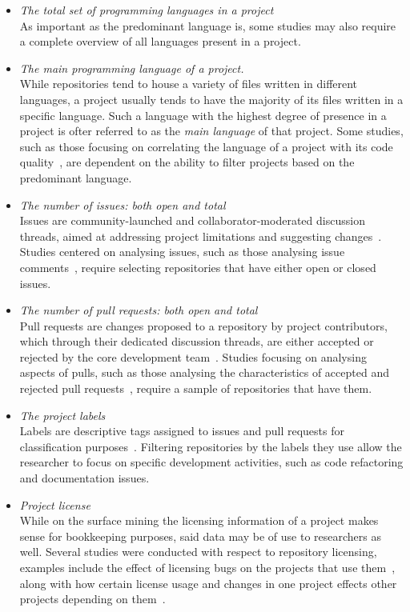 \begin{itemize}
    \item \textit{The total set of programming languages in a project}
    \\As important as the predominant language is, some studies may also require a complete overview of all languages present in a project.
    \item \textit{The main programming language of a project.}
    \\While repositories tend to house a variety of files written in different languages, a project usually tends to have the majority of its files written in a specific language. Such a language with the highest degree of presence in a project is ofter referred to as the \textit{main language} of that project. Some studies, such as those focusing on correlating the language of a project with its code quality~\cite{QUALITY}, are dependent on the ability to filter projects based on the predominant language.
    \item \textit{The number of issues: both open and total}
    \\Issues are community-launched and collaborator-moderated discussion threads, aimed at addressing project limitations and suggesting changes~\cite{GITHUBHELP}. Studies centered on analysing issues, such as those analysing issue comments~\cite{ISSUES}, require selecting repositories that have either open or closed issues.
    \item \textit{The number of pull requests: both open and total}
    \\Pull requests are changes proposed to a repository by project contributors, which through their dedicated discussion threads, are either accepted or rejected by the core development team~\cite{GITHUBHELP}. Studies focusing on analysing aspects of pulls, such as those analysing the characteristics of accepted and rejected pull requests~\cite{PULLS}, require a sample of repositories that have them.
    \item \textit{The project labels}
    \\Labels are descriptive tags assigned to issues and pull requests for classification purposes~\cite{LABELS}. Filtering repositories by the labels they use allow the researcher to focus on specific development activities, such as code refactoring and documentation issues.
    \item \textit{Project license}
    \\While on the surface mining the licensing information of a project makes sense for bookkeeping purposes, said data may be of use to researchers as well. Several studies were conducted with respect to repository licensing, examples include the effect of licensing bugs on the projects that use them~\cite{LICENSEBUGS}, along with how certain license usage and changes in one project effects other projects depending on them~\cite{LICENSECHANGE}.

\end{itemize}
